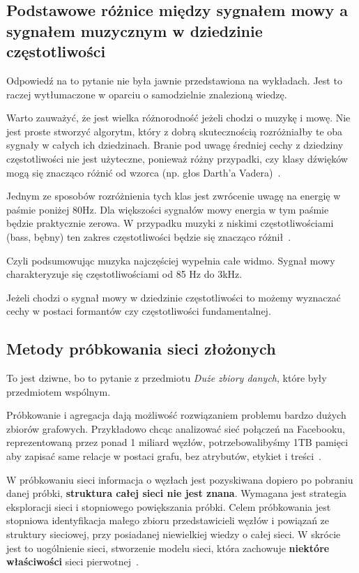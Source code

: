 \documentclass[wi]{zut}
\begin{document}
\subsection{Podstawowe różnice między sygnałem mowy a sygnałem muzycznym w dziedzinie częstotliwości}

Odpowiedź na to pytanie nie była jawnie przedstawiona na wykładach. Jest to raczej wytłumaczone w oparciu o samodzielnie znalezioną wiedzę.
\question

Warto zauważyć, że jest wielka różnorodność jeżeli chodzi o muzykę i mowę. Nie jest proste stworzyć algorytm, który z dobrą skutecznością rozróżniałby te oba sygnały w całych ich dziedzinach. Branie pod uwagę średniej cechy z dziedziny częstotliwości nie jest użyteczne, ponieważ różny przypadki, czy klasy dźwięków mogą się znacząco różnić od wzorca (np. głos Darth'a Vadera)~\cite{hilmar2021speech}.

Jednym ze sposobów rozróżnienia tych klas jest zwrócenie uwagę na energię w paśmie poniżej 80Hz. Dla większości sygnałów mowy energia w tym paśmie będzie praktycznie zerowa. W przypadku muzyki z niskimi częstotliwościami (bass, bębny) ten zakres częstotliwości będzie się znacząco różnił~\cite{hilmar2021speech}.

Czyli podsumowując muzyka najczęściej wypełnia całe widmo. Sygnał mowy charakteryzuje się częstotliwościami od 85 Hz do 3kHz.

Jeżeli chodzi o sygnał mowy w dziedzinie częstotliwości to możemy wyznaczać cechy w postaci formantów czy częstotliwości fundamentalnej.

\subsection{Metody próbkowania sieci złożonych}

To jest dziwne, bo to pytanie z przedmiotu \emph{Duże zbiory danych}, które były przedmiotem wspólnym.

Próbkowanie i agregacja dają możliwość rozwiązaniem problemu bardzo dużych zbiorów grafowych. Przykładowo chcąc analizować sieć połączeń na Facebooku, reprezentowaną przez ponad 1 miliard węzłów, potrzebowalibyśmy 1TB pamięci aby zapisać same relacje w postaci grafu, bez atrybutów, etykiet i treści~\cite{Jankowski2020_probkowanie}. 

W próbkowaniu sieci informacja o węzłach jest pozyskiwana dopiero po pobraniu danej próbki, \textbf{struktura całej sieci nie jest znana}. Wymagana jest strategia eksploracji sieci i stopniowego powiększania próbki. Celem próbkowania jest stopniowa identyfikacja małego zbioru przedstawicieli węzłów i powiązań ze struktury sieciowej, przy posiadanej niewielkiej wiedzy o całej sieci. W skrócie jest to uogólnienie sieci, stworzenie modelu sieci, która zachowuje \textbf{niektóre właściwości} sieci pierwotnej~\cite{Jankowski2020_probkowanie}. 
\end{document}
